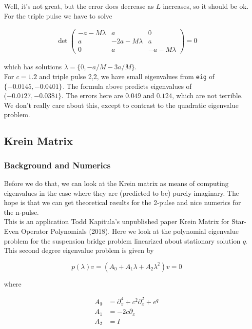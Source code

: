 \documentclass[12pt]{article}
\begin{document}
Well, it's not great, but the error does decrease as $L$ increases, so it should be ok. For the triple pulse we have to solve

\begin{align*}
\det \begin{pmatrix}
-a - M \lambda & a & 0\\
a & -2a - M \lambda & a \\
0 & a & -a - M \lambda
\end{pmatrix} = 0
\end{align*}

which has solutions $\lambda = \{ 0, -a/M -3a/M \}$.\\

For $c = 1.2$ and triple pulse 2,2, we have small eigenvalues from \texttt{eig} of $\{ -0.0145, -0.0401 \}$. The formula above predicts eigenvalues of $( -0.0127, -0.0381 \}$. The errors here are $0.049$ and $0.124$, which are not terrible.\\

We don't really care about this, except to contrast to the quadratic eigenvalue problem.

\subsection{Krein Matrix}

\subsubsection{Background and Numerics}

Before we do that, we can look at the Krein matrix as means of computing eigenvalues in the case where they are (predicted to be) purely imaginary. The hope is that we can get theoretical results for the 2-pulse and nice numerics for the n-pulse.
\\

This is an application Todd Kapitula's unpublished paper Krein Matrix for Star-Even Operator Polynomials (2018). Here we look at the polynomial eigenvalue problem for the suspension bridge problem linearized about stationary solution $q$. This second degree eigenvalue problem is given by

\begin{equation}
p(\lambda)v = (A_0 + A_1 \lambda + A_2 \lambda^2 )v = 0
\end{equation}

where

\begin{align*}
A_0 &= \partial_x^4 + c^2 \partial_x^2 + e^{q} \\
A_1 &= - 2 c \partial_x \\
A_2 &= I 
\end{align*}
\end{document}
